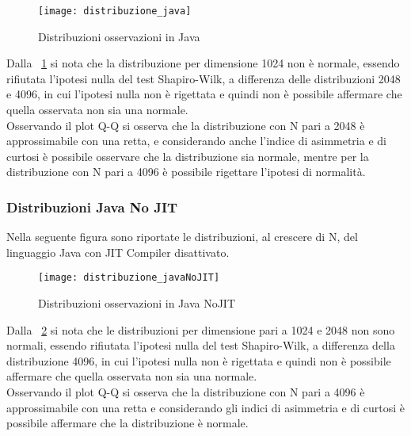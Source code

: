 \begin{figure}[!htbp]
  \texttt{[image: distribuzione\_java]}
  \caption{Distribuzioni osservazioni in Java}
  \label{distribuzione_java}
\end{figure}

Dalla \figurename~\ref{distribuzione_java} si nota
che la distribuzione per dimensione 1024 non è normale, essendo rifiutata
l'ipotesi nulla del test Shapiro-Wilk, a differenza delle distribuzioni 2048 e
4096, in cui l'ipotesi nulla non è rigettata e quindi non è possibile affermare
che quella osservata non sia una normale.\\
Osservando il plot Q-Q si osserva che la distribuzione con N pari a 2048
è approssimabile con una retta, e considerando anche l'indice di asimmetria
e di curtosi è possibile osservare che la distribuzione sia normale, mentre
per la distribuzione con N pari a 4096 è possibile rigettare l'ipotesi di normalità.\\

\clearpage
\subsubsection{Distribuzioni Java No JIT}
Nella seguente figura sono riportate le distribuzioni, al crescere di N, del
linguaggio Java con JIT Compiler disattivato.

\begin{figure}[!htbp]
  \texttt{[image: distribuzione\_javaNoJIT]}
  \caption{Distribuzioni osservazioni in Java NoJIT}
  \label{distribuzione_javaNoJIT}
\end{figure}

Dalla \figurename~\ref{distribuzione_javaNoJIT} si nota
che le distribuzioni per dimensione pari a 1024 e 2048 non sono normali, essendo
rifiutata l'ipotesi nulla del test Shapiro-Wilk, a differenza della distribuzione
4096, in cui l'ipotesi nulla non è rigettata e quindi non è possibile affermare
che quella osservata non sia una normale.\\
Osservando il plot Q-Q si osserva che la distribuzione con N pari a 4096 è
approssimabile con una retta e considerando gli indici di asimmetria e di
curtosi è possibile affermare che la distribuzione è normale.\\

\clearpage

